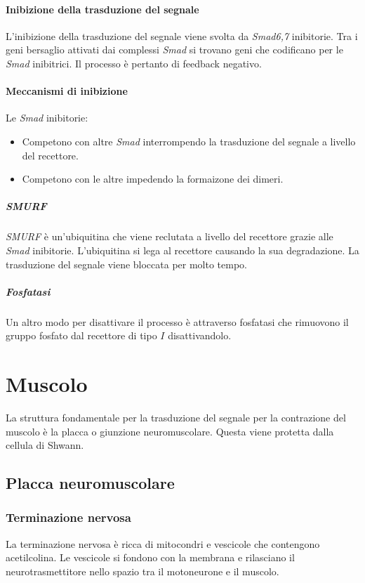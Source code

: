 			\paragraph{Inibizione della trasduzione del segnale}
			L'inibizione della trasduzione del segnale viene svolta da \emph{Smad6,7} inibitorie.
			Tra i geni bersaglio attivati dai complessi \emph{Smad} si trovano geni che codificano per le \emph{Smad} inibitrici.
			Il processo \`e pertanto di feedback negativo.
			
				\paragraph{Meccanismi di inibizione}
				Le \emph{Smad} inibitorie:
				\begin{multicols}{2}
					\begin{itemize}
						\item Competono con altre \emph{Smad} interrompendo la trasduzione del segnale a livello del recettore.
						\item Competono con le altre impedendo la formaizone dei dimeri.
					\end{itemize}
				\end{multicols}

					\subparagraph{\emph{SMURF}}
					\emph{SMURF} \`e un'ubiquitina che viene reclutata a livello del recettore grazie alle \emph{Smad} inibitorie.
					L'ubiquitina si lega al recettore causando la sua degradazione.
					La trasduzione del segnale viene bloccata per molto tempo.

					\subparagraph{Fosfatasi}
					Un altro modo per disattivare il processo \`e attraverso fosfatasi che rimuovono il gruppo fosfato dal recettore di tipo $I$ disattivandolo.
	
\section{Muscolo}
La struttura fondamentale per la trasduzione del segnale per la contrazione del muscolo \`e la placca o giunzione neuromuscolare.
Questa viene protetta dalla cellula di Shwann.

	\subsection{Placca neuromuscolare}

		\subsubsection{Terminazione nervosa}
		La terminazione nervosa \`e ricca di mitocondri e vescicole che contengono acetilcolina.
		Le vescicole si fondono con la membrana e rilasciano il neurotrasmettitore nello spazio tra il motoneurone e il muscolo.

